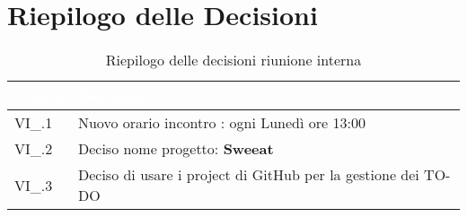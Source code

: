 \section{Riepilogo delle Decisioni}


\begin{table}[!htbp]
\renewcommand{\arraystretch}{1.5}
\begin{tabular}{m{}<{\centering}  m{}<{\centering}}
\rowcolor{darkblue} \textcolor{white}{\textbf{Codice}} & \textcolor{white}{\textbf{Decisione}} \\
\hline
VI\_\D{}.1 & Nuovo orario incontro : ogni Lunedì ore 13:00 \\
\rowcolor{gray!25} VI\_\D{}.2 & Deciso nome progetto: \textbf{Sweeat} \\
VI\_\D{}.3 & Deciso di usare i project di GitHub per la gestione dei TO-DO\\
\end{tabular}
\caption{Riepilogo delle decisioni riunione interna \D{}}
\end{table}